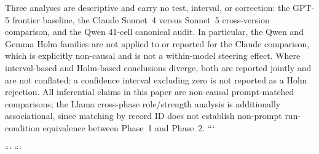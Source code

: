 Three analyses are descriptive and carry no test, interval, or correction: the
GPT-5 frontier baseline, the Claude Sonnet~4 versus Sonnet~5 cross-version
comparison, and the Qwen 41-cell canonical audit. In particular, the Qwen and
Gemma Holm families are not applied to or reported for the Claude comparison,
which is explicitly non-causal and is not a within-model steering effect. Where
interval-based and Holm-based conclusions diverge, both are reported jointly and
are not conflated: a confidence interval excluding zero is not reported as a
Holm rejection. All inferential claims in this paper are non-causal
prompt-matched comparisons; the Llama cross-phase role/strength analysis is
additionally associational, since matching by record ID does not establish
non-prompt run-condition equivalence between Phase~1 and Phase~2.
```

```
```
